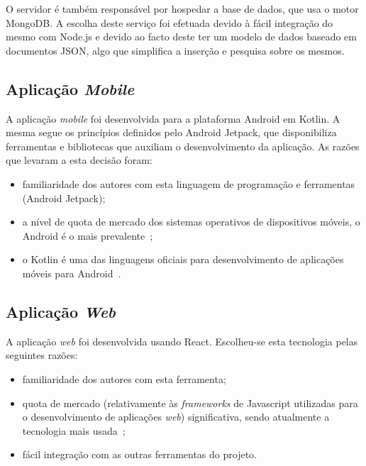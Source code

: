 O servidor é também responsável por hospedar a base de dados, que usa o motor MongoDB. A escolha deste serviço foi efetuada devido à fácil integração do mesmo com Node.js e devido ao facto deste ter um modelo de dados baseado em documentos JSON, algo que simplifica a inserção e pesquisa sobre os mesmos.
\par \medskip

\subsection{Aplicação \textit{Mobile}}
A aplicação \textit{mobile} foi desenvolvida para a plataforma Android em Kotlin. A mesma segue os princípios definidos pelo Android Jetpack, que disponibiliza ferramentas e bibliotecas que auxiliam o desenvolvimento da aplicação. As razões que levaram a esta decisão foram:
\begin{itemize}
	\item familiaridade dos autores com esta linguagem de programação e ferramentas (Android Jetpack);
	\item a nível de quota de mercado dos sistemas operativos de dispositivos móveis, o Android é o mais prevalente~\cite{SCGS2020};
	\item o Kotlin é uma das linguagens oficiais para desenvolvimento de aplicações móveis para Android~\cite{Leiva2017}.
\end{itemize}

\subsection{Aplicação \textit{Web}}
A aplicação \textit{web} foi desenvolvida usando React. Escolheu-se esta tecnologia pelas seguintes razões:

\begin{itemize}
	\item familiaridade dos autores com esta ferramenta;
	\item quota de mercado (relativamente às \textit{frameworks} de Javascript utilizadas para o desenvolvimento de aplicações \textit{web}) significativa, sendo atualmente a tecnologia mais usada~\cite{TechMagic2020};
	\item fácil integração com as outras ferramentas do projeto.
\end{itemize}

